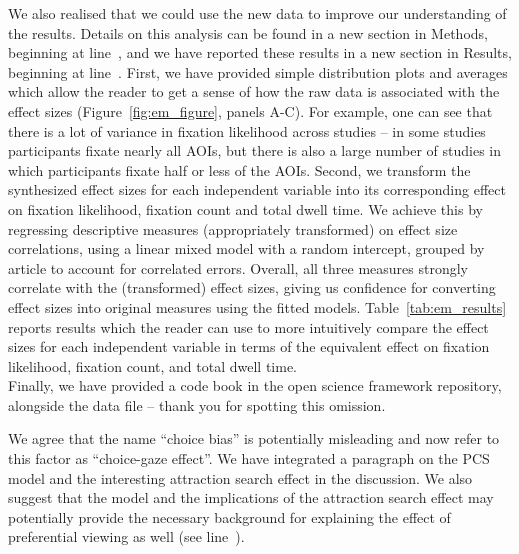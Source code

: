 We also realised that we could use the new data to improve our understanding of the results. Details on this analysis can be found in a new section in Methods, beginning at line~, and we have reported these results in a new section in Results, beginning at line~.
First, we have provided simple distribution plots and averages which allow the reader to get a sense of how the raw data is associated with the effect sizes (Figure~\ref{fig:em_figure}, panels A-C). For example, one can see that there is a lot of variance in fixation likelihood across studies -- in some studies participants fixate nearly all AOIs, but there is also a large number of studies in which participants fixate half or less of the AOIs. Second, we transform the synthesized effect sizes for each independent variable into its corresponding effect on fixation likelihood, fixation count and total dwell time. We achieve this by regressing descriptive measures (appropriately transformed) on effect size correlations, using a linear mixed model with a random intercept, grouped by article to account for correlated errors. Overall, all three measures strongly correlate with the (transformed) effect sizes, giving us confidence for converting effect sizes into original measures using the fitted models. Table~\ref{tab:em_results} reports results which the reader can use to more intuitively compare the effect sizes for each independent variable in terms of the equivalent effect on fixation likelihood, fixation count, and total dwell time.\\

Finally, we have provided a code book in the open science framework repository, alongside the data file -- thank you for spotting this omission.



We agree that the name ``choice bias'' is potentially misleading and now refer to this factor as ``choice-gaze effect''. We have integrated a paragraph on the PCS model and the interesting attraction search effect in the discussion. We also suggest that the model and the implications of the attraction search effect may potentially provide the necessary background for explaining the effect of preferential viewing  as well (see line~).  

